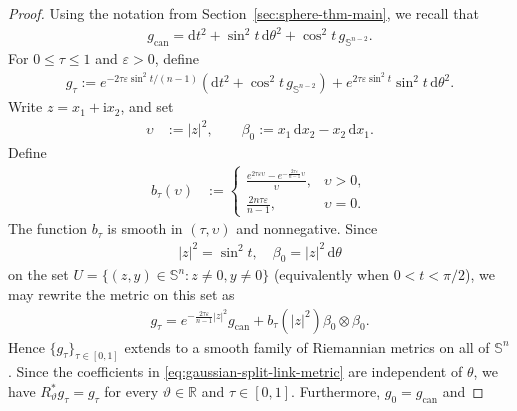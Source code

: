 \documentclass[11pt,reqno]{amsart}
\numberwithin{equation}{section}
\theoremstyle{definition}
\theoremstyle{remark}
\def\bS {\mathbb{S}}
\newcommand{\iii}{\mathrm i}
\newcommand{\ta}{\tau}
\newcommand{\ud}{\mathrm{d}}
\newcommand{\0}{\emptyset}
\newcommand{\veps}{\varepsilon}
\newcommand{\bbR}{\mathbb R}
\newcommand{\bbS}{\mathbb S}
\newcommand{\can}{\mathrm{can}}
\begin{document}
\begin{proof}
Using the notation from Section~\ref{sec:sphere-thm-main}, we recall that 
\begin{align}
        g_\can 
        =
        \ud t^2+\sin^2t\,\ud\theta^2
        +\cos^2t\,g_{\bbS^{n-2}}.
\end{align}
For $0\leq \ta\leq1$ and $\veps>0$, define
\begin{align}\label{eq:gaussian-split-link-metric}
        g_\ta
        :=
        e^{-2 \ta \veps\sin^2t/(n-1)}
        \left(
        \ud t^2+\cos^2t\,g_{\bbS^{n-2}}
        \right)
        +
        e^{2 \ta \veps\sin^2t}\sin^2t\,\ud\theta^2.
\end{align}
Write $z=x_1+\iii x_2$, and set
\begin{align}
        \upsilon
        &:=
        |z|^2,
        \qquad
        \beta_0
        :=
        x_1\,\ud x_2-x_2\,\ud x_1.
\end{align}
Define
\begin{align}
        b_\ta(\upsilon)
        &:=
        \begin{cases}
        \displaystyle
        \frac{
        e^{2\ta\veps\upsilon}
        -
        e^{-\frac{2\ta\veps}{n-1}\upsilon}
        }{\upsilon},
        &
        \upsilon>0,
        \\[2mm]
        \displaystyle
        \frac{2n\ta\veps}{n-1},
        &
        \upsilon=0.
        \end{cases}
\end{align}
The function $b_\ta$ is smooth in $(\ta,\upsilon)$ and nonnegative.
Since
\begin{align}
        |z|^2
        =
        \sin^2t,
        \quad
        \beta_0
        =|z|^2\,\ud\theta
\end{align}
on the set $U=\{(z,y)\in \bS^n:z\neq 0,y\neq 0\}$ (equivalently when $0<t<\pi/2$), we may rewrite the metric on this set as
\begin{align}
        g_\ta
        =
        e^{-\frac{2\ta\veps}{n-1}|z|^2}g_{\can}
        +
        b_\ta(|z|^2)\beta_0\otimes\beta_0.
\end{align}
Hence $\{g_\ta\}_{\ta\in[0,1]}$ extends to a smooth family of
Riemannian metrics on all of $\bbS^n$. Since the coefficients in \eqref{eq:gaussian-split-link-metric} are independent of $\theta$, we have $R_\vartheta^*g_\ta=g_\ta$ for every $\vartheta\in\bbR$ and $\ta\in[0,1]$. Furthermore, $g_0= g_\can$ and

\end{proof}
\end{document}
